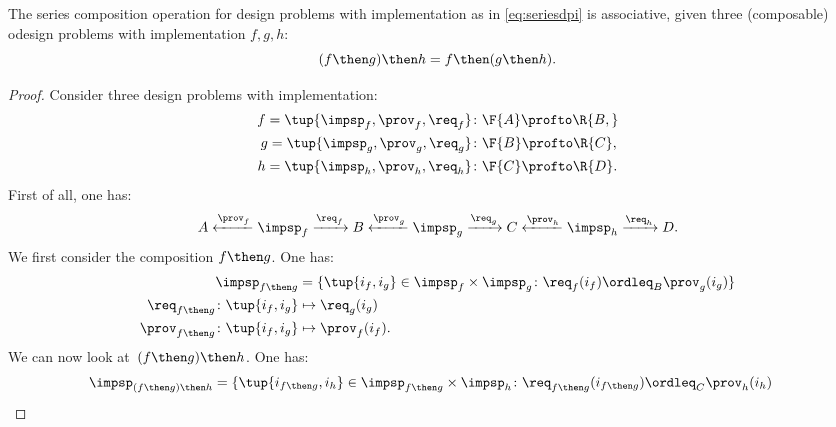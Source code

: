 \begin{lemma}
    The series composition operation for design problems with implementation as in \cref{eq:seriesdpi} is associative, \ie  given three (composable) odesign problems with implementation $f,g,h$:
    \begin{equation}
        (f\then g)
        \then h = f\then (g\then h).
    \end{equation}
\end{lemma}
\begin{proof}
    Consider three design problems with implementation:
    \begin{equation}
        \begin{aligned}
            f=\tup{{\impsp_f, \prov_f, \req_f} } & \colon \F{A} \profto\R{B,}  \\
            g=\tup{\impsp_g, \prov_g, \req_g}    & \colon \F{B} \profto \R{C}, \\
            h=\tup{\impsp_h, \prov_h, \req_h}    & \colon \F{C} \profto \R{D}.
        \end{aligned}
    \end{equation}
    First of all, one has:
    \begin{equation}
        A \xleftarrow{\prov_f} \impsp_f \xrightarrow{\req_f} B
        \xleftarrow{\prov_g} \impsp_g \xrightarrow{\req_g} C
        \xleftarrow{\prov_h} \impsp_h \xrightarrow{\req_h} D.
    \end{equation}
    We first consider the composition $f\then g$.
    One has:
    \begin{equation}
        \begin{aligned}
            \impsp_{f\then g}                       & = \{
            \tup{i_f,i_g} \in \impsp_f \times \impsp_g \colon
            \req_f(i_f) \ordleq_{B} \prov_g(i_g)
            \}                                                              \\
            \req_{f\then g}  \colon  \tup{i_f,i_g}  & \mapsto \req_g(i_g)   \\
            \prov_{f\then g}  \colon  \tup{i_f,i_g} & \mapsto \prov_f(i_f).
        \end{aligned}
    \end{equation}
    We can now look at~$(f\then g)\then h$.
    One has:
    \begin{equation}
        \begin{aligned}
             & \impsp_{(f\then g)\then h} = \{
            \tup{i_{f\then g},i_h} \in \impsp_{f\then g} \times \impsp_{h}\colon
            \req_{f\then g}(i_{f\then g}) \ordleq_{C} \prov_h(i_h)

\end{aligned}
\end{equation}
\end{proof}
